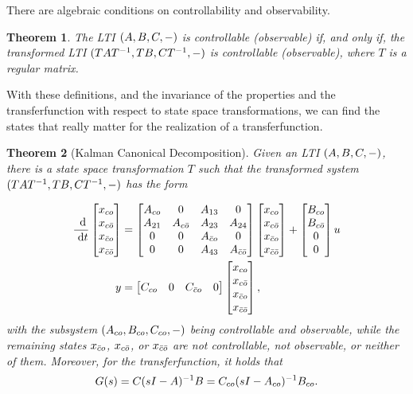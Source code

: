 \documentclass[a4paper,10pt]{article}
\newtheorem{theorem}{Theorem}[section]
\theoremstyle{definition}
\begin{document}
There are algebraic conditions on controllability and observability.

\begin{theorem}
	The LTI $(A,B,C,-)$ is controllable (observable) if, and only if, the transformed LTI $(TAT^{-1},TB,CT^{-1},-)$ is controllable (observable), where $T$ is a regular matrix.
\end{theorem}

With these definitions, and the invariance of the properties and the transferfunction with respect to state space transformations, we can find the states that really matter for the realization of a transferfunction.

\begin{theorem}[Kalman Canonical Decomposition]
	Given an LTI $(A,B,C,-)$, there is a state space transformation $T$ such that the transformed system $(TAT^{-1},TB,CT^{-1},-)$ has the form 

	\begin{align*}
		\frac {\text{~\textup{d}}}{\text{~\textup{d}} t}
		\begin{bmatrix} x_{co} \\ x_{c\bar o} \\ x_{\bar c o} \\ x_{\bar c \bar o} \end{bmatrix} 
			&= 
		\begin{bmatrix}
			A_{co} & 0 & A_{13} & 0 \\
			A_{21} & A_{c \bar o} & A_{23} & A_{24} \\
			0 & 0 & A_{\bar c o} & 0 \\
			0 & 0 & A_{43} & A_{\bar c \bar o} 
		\end{bmatrix}
		\begin{bmatrix} x_{co} \\ x_{c\bar o} \\ x_{\bar c o} \\ x_{\bar c \bar o} \end{bmatrix}
			+
		\begin{bmatrix} B_{co} \\ B_{c \bar o} \\ 0 \\ 0 \end{bmatrix} u \\
			y &= 
			\begin{bmatrix} C_{co} & 0 & C_{\bar c o} & 0 \end{bmatrix}
		\begin{bmatrix} x_{co} \\ x_{c\bar o} \\ x_{\bar c o} \\ x_{\bar c \bar o} \end{bmatrix},
	\end{align*}
	with the subsystem $(A_{co}, B_{co}, C_{co}, -)$ being controllable and observable, while the remaining states $x_{\bar c o}$, $x_{c \bar o}$, or $x_{\bar c \bar o}$ are not controllable, not observable, or neither of them.
	Moreover, for the transferfunction, it holds that
	\begin{equation*}
		G(s) = C(sI-A)^{-1}B = C_{co}(sI-A_{co})^{-1}B_{co}.
	\end{equation*}
\end{theorem}
\end{document}

